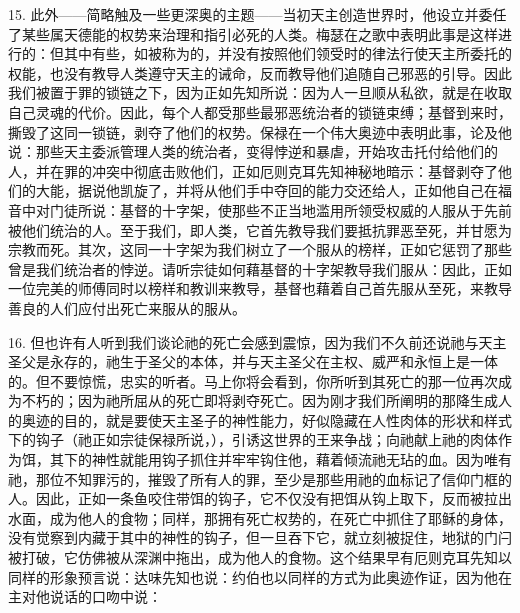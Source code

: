 15. 此外——简略触及一些更深奥的主题——当初天主创造世界时，他设立并委任了某些属天德能的权势来治理和指引必死的人类。梅瑟在之歌中表明此事是这样进行的：但其中有些，如被称为的，并没有按照他们领受时的律法行使天主所委托的权能，也没有教导人类遵守天主的诫命，反而教导他们追随自己邪恶的引导。因此我们被置于罪的锁链之下，因为正如先知所说：因为人一旦顺从私欲，就是在收取自己灵魂的代价。因此，每个人都受那些最邪恶统治者的锁链束缚；基督到来时，撕毁了这同一锁链，剥夺了他们的权势。保禄在一个伟大奥迹中表明此事，论及他说：那些天主委派管理人类的统治者，变得悖逆和暴虐，开始攻击托付给他们的人，并在罪的冲突中彻底击败他们，正如厄则克耳先知神秘地暗示：基督剥夺了他们的大能，据说他凯旋了，并将从他们手中夺回的能力交还给人，正如他自己在福音中对门徒所说：基督的十字架，使那些不正当地滥用所领受权威的人服从于先前被他们统治的人。至于我们，即人类，它首先教导我们要抵抗罪恶至死，并甘愿为宗教而死。其次，这同一十字架为我们树立了一个服从的榜样，正如它惩罚了那些曾是我们统治者的悖逆。请听宗徒如何藉基督的十字架教导我们服从：因此，正如一位完美的师傅同时以榜样和教训来教导，基督也藉着自己首先服从至死，来教导善良的人们应付出死亡来服从的服从。\par

16. 但也许有人听到我们谈论祂的死亡会感到震惊，因为我们不久前还说祂与天主圣父是永存的，祂生于圣父的本体，并与天主圣父在主权、威严和永恒上是一体的。但不要惊慌，忠实的听者。马上你将会看到，你所听到其死亡的那一位再次成为不朽的；因为祂所屈从的死亡即将剥夺死亡。因为刚才我们所阐明的那降生成人的奥迹的目的，就是要使天主圣子的神性能力，好似隐藏在人性肉体的形状和样式下的钩子（祂正如宗徒保禄所说，），引诱这世界的王来争战；向祂献上祂的肉体作为饵，其下的神性就能用钩子抓住并牢牢钩住他，藉着倾流祂无玷的血。因为唯有祂，那位不知罪污的，摧毁了所有人的罪，至少是那些用祂的血标记了信仰门框的人。因此，正如一条鱼咬住带饵的钩子，它不仅没有把饵从钩上取下，反而被拉出水面，成为他人的食物；同样，那拥有死亡权势的，在死亡中抓住了耶稣的身体，没有觉察到内藏于其中的神性的钩子，但一旦吞下它，就立刻被捉住，地狱的门闩被打破，它仿佛被从深渊中拖出，成为他人的食物。这个结果早有厄则克耳先知以同样的形象预言说：达味先知也说：约伯也以同样的方式为此奥迹作证，因为他在主对他说话的口吻中说：\par

